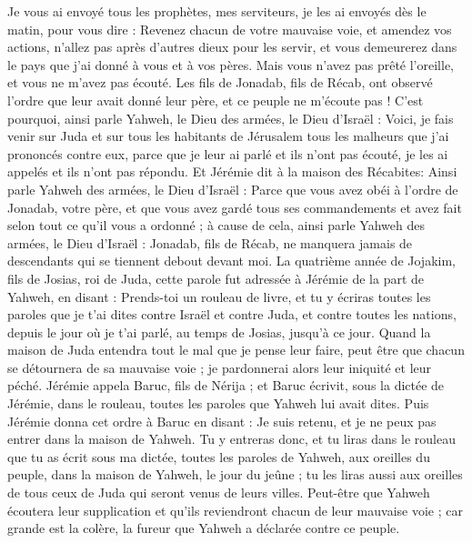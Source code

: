 \begin{multicols}{2}
Je vous ai envoyé tous les prophètes, mes serviteurs, je les ai envoyés dès le matin, pour vous dire : Revenez chacun de votre mauvaise voie, et amendez vos actions, n’allez pas après d'autres dieux pour les servir, et vous demeurerez dans le pays que j'ai donné à vous et à vos pères. Mais vous n'avez pas prêté l’oreille, et vous ne m'avez pas écouté.
Les fils de Jonadab, fils de Récab, ont observé l’ordre que leur avait donné leur père, et ce peuple ne m'écoute pas !
C’est pourquoi, ainsi parle Yahweh, le Dieu des armées, le Dieu d'Israël : Voici, je fais venir sur Juda et sur tous les habitants de Jérusalem tous les malheurs que j'ai prononcés contre eux, parce que je leur ai parlé et ils n'ont pas écouté, je les ai appelés et ils n'ont pas répondu.
Et Jérémie dit à la maison des Récabites: Ainsi parle Yahweh des armées, le Dieu d'Israël : Parce que vous avez obéi à l’ordre de Jonadab, votre père, et que vous avez gardé tous ses commandements et avez fait selon tout ce qu'il vous a ordonné ;
à cause de cela, ainsi parle Yahweh des armées, le Dieu d'Israël : Jonadab, fils de Récab, ne manquera jamais de descendants qui se tiennent debout devant moi.
\VerseOne{}La quatrième année de Jojakim, fils de Josias, roi de Juda, cette parole fut adressée à Jérémie de la part de Yahweh, en disant :
Prends-toi un rouleau de livre, et tu y écriras toutes les paroles que je t’ai dites contre Israël et contre Juda, et contre toutes les nations, depuis le jour où je t'ai parlé, au temps de Josias, jusqu’à ce jour.
Quand la maison de Juda entendra tout le mal que je pense leur faire, peut être que chacun se détournera de sa mauvaise voie ; je pardonnerai alors leur iniquité et leur péché.
Jérémie appela Baruc, fils de Nérija ; et Baruc écrivit, sous la dictée de Jérémie, dans le rouleau, toutes les paroles que Yahweh lui avait dites.
Puis Jérémie donna cet ordre à Baruc en disant : Je suis retenu, et je ne peux pas entrer dans la maison de Yahweh.
Tu y entreras donc, et tu liras dans le rouleau que tu as écrit sous ma dictée, toutes les paroles de Yahweh, aux oreilles du peuple, dans la maison de Yahweh, le jour du jeûne ; tu les liras aussi aux oreilles de tous ceux de Juda qui seront venus de leurs villes.
Peut-être que Yahweh écoutera leur supplication et qu’ils reviendront chacun de leur mauvaise voie ; car grande est la colère, la fureur que Yahweh a déclarée contre ce peuple.

\end{multicols}
